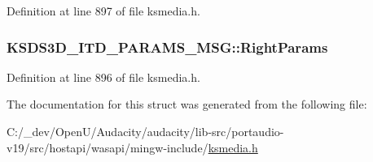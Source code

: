 Definition at line 897 of file ksmedia.\+h.

\subsubsection[{\texorpdfstring{Right\+Params}{RightParams}}]{ K\+S\+D\+S3\+D\+\_\+\+I\+T\+D\+\_\+\+P\+A\+R\+A\+M\+S\+\_\+\+M\+S\+G\+::\+Right\+Params}\hypertarget{struct_k_s_d_s3_d___i_t_d___p_a_r_a_m_s___m_s_g_a7f7d218baf99ce8e6eb04e76cad9b85d}{}\label{struct_k_s_d_s3_d___i_t_d___p_a_r_a_m_s___m_s_g_a7f7d218baf99ce8e6eb04e76cad9b85d}


Definition at line 896 of file ksmedia.\+h.



The documentation for this struct was generated from the following file\+:\begin{DoxyCompactItemize}
\item 
C\+:/\+\_\+dev/\+Open\+U/\+Audacity/audacity/lib-\/src/portaudio-\/v19/src/hostapi/wasapi/mingw-\/include/\hyperlink{ksmedia_8h}{ksmedia.\+h}\end{DoxyCompactItemize}
